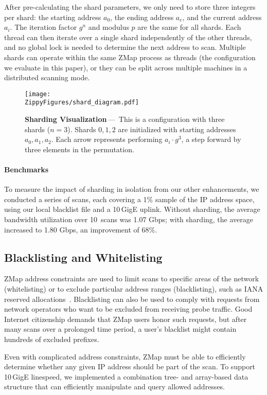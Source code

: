 After pre-calculating the shard parameters, we only need to store three
integers per shard: the starting address $a_0$, the ending address $a_e$, and
the current address $a_i$. The iteration factor $g^n$ and modulus $p$ are the
same for all shards. Each thread can then iterate over a single shard
independently of the other threads, and no global lock is needed to determine
the next address to scan. Multiple shards can operate within the same ZMap
process as threads (the configuration we evaluate in this paper), or they can
be split across multiple machines in a distributed scanning mode.

\begin{figure}\centering
\texttt{[image: \\ZippyFigures/shard\_diagram.pdf]}
\caption{\textbf{Sharding Visualization}\,---\,%
This is a configuration with three shards ($n = 3$). Shards $0,1,2$ are
initialized with starting addresses $a_0,a_1,a_2$. Each arrow represents
performing $a_i \cdot g^3$, a step forward by three elements in the
permutation.
}
\label{fig:sharding}
\end{figure}

\paragraph{Benchmarks}
To measure the impact of sharding in isolation from our other enhancements,
we conducted a series of scans, each covering a 1\% sample of the IP address
space, using our local blacklist file and a 10\,GigE uplink. Without
sharding, the average bandwidth utilization over 10~scans was 1.07 Gbps; with
sharding, the average increased to 1.80 Gbps, an improvement of 68\%.

\subsection{Blacklisting and Whitelisting}
 
ZMap address constraints are used to limit scans to specific areas of the
network (whitelisting) or to exclude particular address ranges
(blacklisting), such as IANA reserved allocations~\cite{iana}. Blacklisting
can also be used to comply with requests from network operators who want to
be excluded from receiving probe traffic. Good Internet citizenship demands
that ZMap users honor such requests, but after many scans over a prolonged
time period, a user's blacklist might contain hundreds of excluded prefixes.
 
Even with complicated address constraints, ZMap must be able to efficiently
determine whether any given IP address should be part of the scan. To support
10\,GigE linespeed, we implemented a combination tree- and array-based data
structure that can efficiently manipulate and query allowed addresses.


